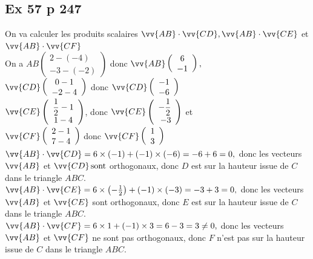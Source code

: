 \documentclass[12pt,a4paper]{book}
\begin{document}
\subsection*{Ex 57 p 247}
On va calculer les produits scalaires $\vv{A B} \cdot \vv{C D}, \vv{A B} \cdot \vv{C E}$ et $\vv{A B} \cdot \vv{C F}$\\
On a $A B\left(\begin{array}{c}2-(-4) \\ -3-(-2)\end{array}\right)$ donc $ \vv{A B}\left(\begin{array}{c}6 \\ -1\end{array}\right),$\\
$\vv{C D}\left(\begin{array}{c}0-1 \\ -2-4\end{array}\right)$ donc $ \vv{C D}\left(\begin{array}{c}-1 \\ -6\end{array}\right)$\\
$\vv{C E}\left(\begin{array}{c}\dfrac{1}{2}-1 \\ 1-4\end{array}\right)$, donc $ \vv{C E}\left(\begin{array}{r}-\dfrac{1}{2} \\ -3\end{array}\right)$ et \\
$\vv{C F}\left(\begin{array}{c}2-1 \\ 7-4\end{array}\right)$ donc $ \vv{C F}\left(\begin{array}{l}1 \\ 3\end{array}\right)$\\

$\vv{A B} \cdot \vv{C D}=6 \times(-1)+(-1) \times(-6)=-6+6=0,$ donc les vecteurs $\vv{A B}$ et $\vv{C D} \operatorname{sont}$
orthogonaux, donc $D$ est sur la hauteur issue de $C$ dans le triangle $A B C$.\\ $\vv{A B} \cdot \vv{C E}=6 \times\left(-\frac{1}{2}\right)+(-1) \times(-3)=-3+3=0,$ donc les vecteurs $\vv{A B}$ et $\vv{C E}$ sont
orthogonaux, donc $E$ est sur la hauteur issue de $C$ dans le triangle $A B C$.\\ $\vv{A B} \cdot \vv{C F}=6 \times 1+(-1) \times 3=6-3=3 \neq 0,$ donc les vecteurs $\vv{A B}$ et $\vv{C F}$ ne sont pas orthogonaux, donc $F$ n'est pas sur la hauteur issue de $C$ dans le triangle $A B C$.
\end{document}
